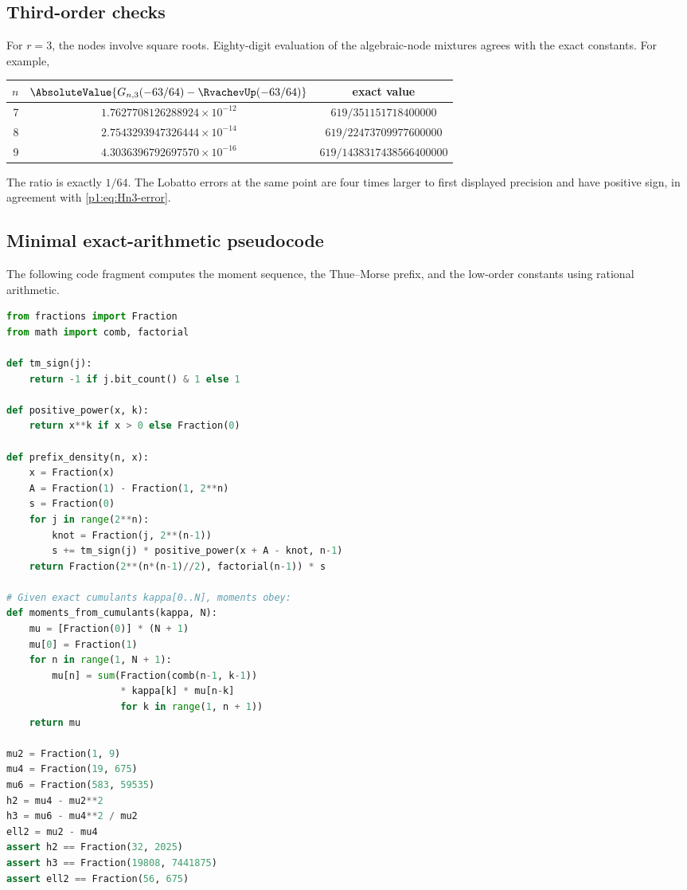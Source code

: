 \documentclass[11pt]{article}
\numberwithin{equation}{section}
\theoremstyle{definition}
\theoremstyle{remark}
\begin{document}
\subsection{Third-order checks}

For $r=3$, the nodes involve square roots.  Eighty-digit evaluation of the algebraic-node mixtures agrees with the exact constants.  For example,
\begin{center}
\begin{tabular}{@{}rcc@{}}
\toprule
$n$ & $\AbsoluteValue{G_{n,3}(-63/64)-\RvachevUp(-63/64)}$ & exact value\\
\midrule
7 & $1.7627708126288924\times10^{-12}$ & $619/351151718400000$\\
8 & $2.7543293947326444\times10^{-14}$ & $619/22473709977600000$\\
9 & $4.3036396792697570\times10^{-16}$ & $619/1438317438566400000$\\
\bottomrule
\end{tabular}
\end{center}
The ratio is exactly $1/64$.  The Lobatto errors at the same point are four times larger to first displayed precision and have positive sign, in agreement with \eqref{p1:eq:Hn3-error}.

\subsection{Minimal exact-arithmetic pseudocode}

The following code fragment computes the moment sequence, the Thue--Morse prefix, and the low-order constants using rational arithmetic.

\begin{lstlisting}[style=code,language=Python,caption={Exact arithmetic for moments and dyadic prefix values.}]
from fractions import Fraction
from math import comb, factorial

def tm_sign(j):
    return -1 if j.bit_count() & 1 else 1

def positive_power(x, k):
    return x**k if x > 0 else Fraction(0)

def prefix_density(n, x):
    x = Fraction(x)
    A = Fraction(1) - Fraction(1, 2**n)
    s = Fraction(0)
    for j in range(2**n):
        knot = Fraction(j, 2**(n-1))
        s += tm_sign(j) * positive_power(x + A - knot, n-1)
    return Fraction(2**(n*(n-1)//2), factorial(n-1)) * s

# Given exact cumulants kappa[0..N], moments obey:
def moments_from_cumulants(kappa, N):
    mu = [Fraction(0)] * (N + 1)
    mu[0] = Fraction(1)
    for n in range(1, N + 1):
        mu[n] = sum(Fraction(comb(n-1, k-1))
                    * kappa[k] * mu[n-k]
                    for k in range(1, n + 1))
    return mu

mu2 = Fraction(1, 9)
mu4 = Fraction(19, 675)
mu6 = Fraction(583, 59535)
h2 = mu4 - mu2**2
h3 = mu6 - mu4**2 / mu2
ell2 = mu2 - mu4
assert h2 == Fraction(32, 2025)
assert h3 == Fraction(19808, 7441875)
assert ell2 == Fraction(56, 675)
\end{lstlisting}
\end{document}

